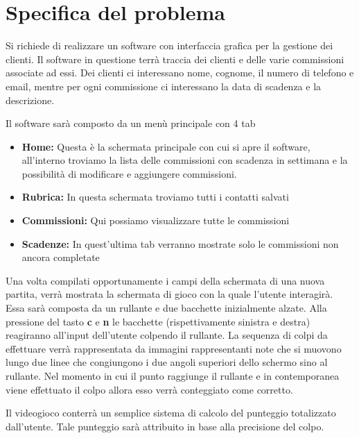 \section{Specifica del problema}
Si richiede di realizzare un software con interfaccia grafica per la gestione dei clienti. Il software in questione terrà traccia dei clienti e delle varie commissioni
associate ad essi. Dei clienti ci interessano nome, cognome, il numero di telefono e email, mentre per ogni commissione ci interessano
la data di scadenza e la descrizione.

Il software sarà composto da un menù principale con 4 tab 
\begin{itemize}
        \item \textbf{Home:} Questa è la schermata principale con cui si apre il software, all'interno
        troviamo la lista delle commissioni con scadenza in settimana e la possibilità di modificare
        e aggiungere commissioni.
        \item \textbf{Rubrica:} In questa schermata troviamo tutti i contatti %
        salvati %
        \item \textbf{Commissioni:} Qui possiamo visualizzare tutte le commissioni
        \item \textbf{Scadenze:} In quest'ultima tab verranno mostrate solo le commissioni non ancora completate %
\end{itemize}


\medskip



Una volta compilati opportunamente i campi della schermata di una nuova partita, verrà mostrata la schermata di gioco con la quale l'utente interagirà.
Essa sarà composta da un rullante e due bacchette inizialmente alzate. Alla pressione del tasto \textbf{c} e \textbf{n} le bacchette (rispettivamente sinistra e destra) reagiranno all'input dell'utente colpendo il rullante.
La sequenza di colpi da effettuare verrà rappresentata da immagini rappresentanti note che si muovono lungo due linee che congiungono i due angoli superiori dello schermo sino al rullante.
Nel momento in cui il punto raggiunge il rullante e in contemporanea viene effettuato il colpo allora esso verrà conteggiato come corretto.

\medskip
Il videogioco conterrà un semplice sistema di calcolo del punteggio totalizzato dall'utente.
Tale punteggio sarà attribuito in base alla precisione del colpo.

